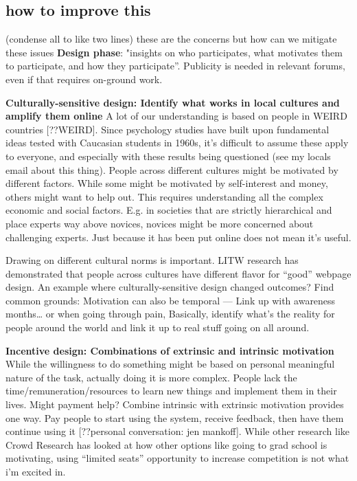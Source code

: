 \subsection{how to improve this}
(condense all to like two lines)
these are the concerns but how can we mitigate these issues
\textbf{Design phase}: "insights on who participates, what motivates them to participate, and how they participate”. Publicity is needed in relevant forums, even if that requires on-ground work.

\textbf{Culturally-sensitive design: Identify what works in local cultures and amplify them online}
A lot of our understanding is based on people in WEIRD countries [??WEIRD]. Since psychology studies have built upon fundamental ideas tested with Caucasian students in 1960s, it’s difficult to assume these apply to everyone, and especially with these results being questioned (see my locals email about this thing). People across different cultures might be motivated by different factors. While some might be motivated by self-interest and money, others might want to help out.  This requires understanding all the complex economic and social factors. E.g. in societies that are strictly hierarchical and place experts way above novices, novices might be more concerned about challenging experts. Just because it has been put online does not mean it’s useful. 

Drawing on different cultural norms is important. LITW research has demonstrated that people across cultures have different flavor for “good” webpage design. An example where culturally-sensitive design changed outcomes?
Find common grounds: Motivation can also be temporal — Link up with awareness months… or when going through pain, Basically, identify what’s the reality for people around the world and link it up to real stuff going on all around. 

\textbf{Incentive design: Combinations of extrinsic and intrinsic motivation}
While the willingness to do something might be based on personal meaningful nature of the task, actually doing it is more complex. People lack the time/remuneration/resources to learn new things and implement them in their lives. Might payment help? Combine intrinsic with extrinsic motivation provides one way. Pay people to start using the system, receive feedback, then have them continue using it [??personal conversation: jen mankoff]. While other research like Crowd Research has looked at how other options like going to grad school is motivating, using “limited seats” opportunity to increase competition is not what i’m excited in. 

